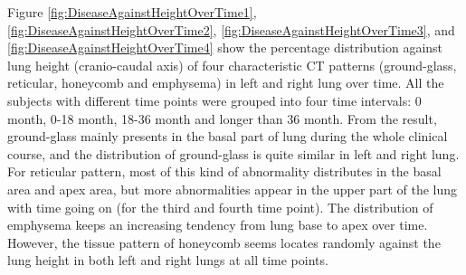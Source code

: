 Figure \ref{fig:DiseaseAgainstHeightOverTime1}, \ref{fig:DiseaseAgainstHeightOverTime2}, \ref{fig:DiseaseAgainstHeightOverTime3}, and \ref{fig:DiseaseAgainstHeightOverTime4} show the percentage distribution against lung height (cranio-caudal axis) of four characteristic CT patterns (ground-glass, reticular, honeycomb and emphysema) in left and right lung over time. All the subjects with different time points were grouped into four time intervals: 0 month, 0-18 month, 18-36 month and longer than 36 month. From the result, ground-glass mainly presents in the basal part of lung during the whole clinical course, and the distribution of ground-glass is quite similar in left and right lung. For reticular pattern, most of this kind of abnormality distributes in the basal area and apex area, but more abnormalities appear in the upper part of the lung with time going on (for the third and fourth time point). The distribution of emphysema keeps an increasing tendency from lung base to apex over time. However, the tissue pattern of honeycomb seems locates randomly against the lung height in both left and right lungs at all time points.

